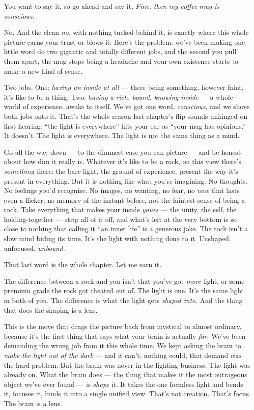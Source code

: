 \documentclass[11pt,openany]{book}
\begin{document}
You want to say it, so go ahead and say it. \textit{Fine, then my coffee mug is conscious.}

No. And the clean \textit{no,} with nothing tucked behind it, is exactly where this whole picture earns your trust or blows it. Here’s the problem: we’ve been making one little word do two gigantic and totally different jobs, and the second you pull them apart, the mug stops being a headache and your own existence starts to make a new kind of sense.

Two jobs. One: \textit{having an inside at all} — there being something, however faint, it’s like to be a thing. Two: \textit{having a rich, bound, knowing inside} — a whole world of experience, awake to itself. We’ve got one word, \textit{conscious,} and we shove both jobs onto it. That’s the whole reason last chapter’s flip sounds unhinged on first hearing: “the light is everywhere” hits your ear as “your mug has opinions.” It doesn’t. The light is everywhere. The light is not the same thing as a mind.

Go all the way down — to the dimmest case you can picture — and be honest about how dim it really is. Whatever it’s like to be a rock, on this view there’s \textit{something} there: the bare light, the ground of experience, present the way it’s present in everything. But it is nothing like what you’re imagining. No thoughts. No feelings you’d recognize. No images, no wanting, no fear, no \textit{now} that lasts even a flicker, no memory of the instant before, not the faintest sense of being a rock. Take everything that makes your inside \textit{yours} — the unity, the self, the holding-together — strip all of it off, and what’s left at the very bottom is so close to nothing that calling it “an inner life” is a generous joke. The rock isn’t a slow mind biding its time. It’s the light with nothing done to it. Unshaped, unfocused, \textit{unbound.}

That last word is the whole chapter. Let me earn it.

The difference between a rock and you isn’t that you’ve got \textit{more} light, or some premium grade the rock got cheated out of. The light is one. It’s the same light in both of you. The difference is what the light gets \textit{shaped into.} And the thing that does the shaping is a lens.

This is the move that drags the picture back from mystical to almost ordinary, because it’s the first thing that says what your brain is actually \textit{for.} We’ve been demanding the wrong job from it this whole time. We kept asking the brain to \textit{make the light out of the dark} — and it can’t, nothing could, that demand \textit{was} the hard problem. But the brain was never in the lighting business. The light was already on. What the brain does — the thing that makes it the most outrageous object we’ve ever found — is \textit{shape} it. It takes the one formless light and bends it, focuses it, binds it into a single unified view. That’s not creation. That’s focus. The brain is a lens.
\end{document}
